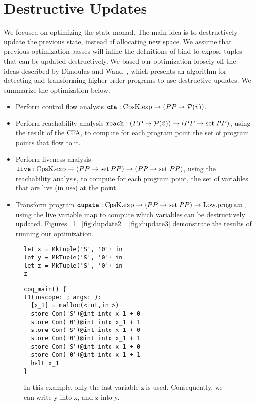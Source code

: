 \documentclass{article}
\begin{document}
\section{Destructive Updates}
\label{sec:destructive-updates}

We focused on optimizing the state monad. The main idea is to destructively update the previous state, instead of allocating new space. We assume that previous optimization passes will inline the definitions of bind to expose tuples that can be updated destructively. We based our optimization loosely off the ideas described by Dimoulas and Wand~\cite{dimoulas2009higher}, which presents an algorithm for detecting and transforming higher-order programs to use destructive updates. We summarize the optimization below. 

\begin{itemize}
\item Perform control flow analysis ${\tt cfa} : {\rm CpsK.exp} \rightarrow (PP \rightarrow \mathcal{P}(\hat{v}))$. 
\item Perform reachability analysis ${\tt reach} : (PP \rightarrow \mathcal{P}(\hat{v})) \rightarrow (PP \rightarrow {\rm set} \; PP)$, using the result of the CFA, to compute for each program point the set of program points that flow to it.
\item Perform liveness analysis ${\tt live} : {\rm CpsK.exp} \rightarrow (PP \rightarrow {\rm set} \; PP) \rightarrow (PP \rightarrow {\rm set} \; PP)$, using the reachability analysis, to compute for each program point, the set of variables that are live (in use) at the point.
\item Transform program ${\tt dupate} : {\rm CpsK.exp} \rightarrow (PP \rightarrow {\rm set} \; PP) \rightarrow {\rm Low.program}$, using the live variable map to compute which variables can be destructively updated. Figures ~\ref{fig:dupdate1} ~\ref{fig:dupdate2} ~\ref{fig:dupdate3} demonstrate the results of running our optimization.
\end{itemize}

\begin{figure}
\centering
\begin{minipage}[t]{.4\textwidth}
\begin{lstlisting}
let x = MkTuple('S', '0') in
let y = MkTuple('S', '0') in
let z = MkTuple('S', '0') in
z
\end{lstlisting}
\end{minipage}
\hspace{20pt}
\begin{minipage}[t]{.4\textwidth}
\begin{lstlisting}
coq_main() {
l1(inscope: ; args: ):
  [x_1] = malloc(<int,int>)
  store Con('S')@int into x_1 + 0
  store Con('0')@int into x_1 + 1
  store Con('S')@int into x_1 + 0
  store Con('0')@int into x_1 + 1
  store Con('S')@int into x_1 + 0
  store Con('0')@int into x_1 + 1
  halt x_1
}
\end{lstlisting}
\end{minipage}
\label{fig:dupdate1}
\caption{In this example, only the last variable z is
   used. Consequently, we can write y into x, and z into y. }
\end{figure}
\end{document}
